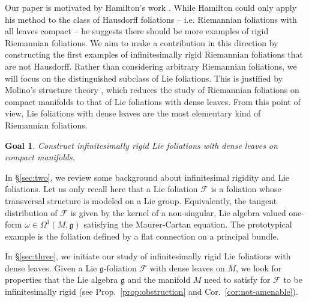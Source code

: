 \documentclass[11pt, letterpaper, oneside,reqno]{amsart}
\theoremstyle{plain}
\newtheorem*{goal}{Goal}
\theoremstyle{underline}
\theoremstyle{definition}
\theoremstyle{remark}
\begin{document}
	
	
	
	\vspace{0.2cm}
	
	Our paper is motivated by Hamilton's work \cite{Hamilton}. While Hamilton could only apply his method to the class of Hausdorff foliations -- i.e. Riemannian foliations with all leaves compact -- he suggests there should be more examples of rigid Riemannian foliations. We aim to make a contribution in this direction by constructing the first examples of infinitesimally rigid Riemannian foliations that are not Hausdorff. Rather than considering arbitrary Riemannian foliations, we will focus on the distinguished subclass of Lie foliations. This is justified by Molino's structure theory \cite{Molino}, which reduces the study of Riemannian foliations on compact manifolds to that of Lie foliations with dense leaves. From this point of view, Lie foliations with dense leaves are the most elementary kind of Riemannian foliations. 
	
	\begin{goal}
	Construct infinitesimally rigid Lie foliations with dense leaves on compact manifolds.
	\end{goal}
	
	In \S\ref{sec:two}, we review some background about infinitesimal rigidity and Lie foliations. Let us only recall here that a Lie foliation $\mathcal{F}$ is a foliation whose transversal structure is modeled on a Lie group. Equivalently, the tangent distribution of $\mathcal{F}$ is given by the kernel of a non-singular, Lie algebra valued one-form $\omega\in\Omega^{1}(M,\mathfrak{g})$ satisfying the Maurer-Cartan equation. The prototypical example is the foliation defined by a flat connection on a principal bundle.
	
	\vspace{0.2cm}
	
	In \S\ref{sec:three}, we initiate our study of infinitesimally rigid Lie foliations with dense leaves. Given a Lie $\mathfrak{g}$-foliation $\mathcal{F}$ with dense leaves on $M$, we look for properties that the Lie algebra $\mathfrak{g}$ and the manifold $M$ need to satisfy for $\mathcal{F}$ to be infinitesimally rigid (see Prop.~\ref{prop:obstruction} and Cor.~\ref{cor:not-amenable}). 
	
\end{document}
